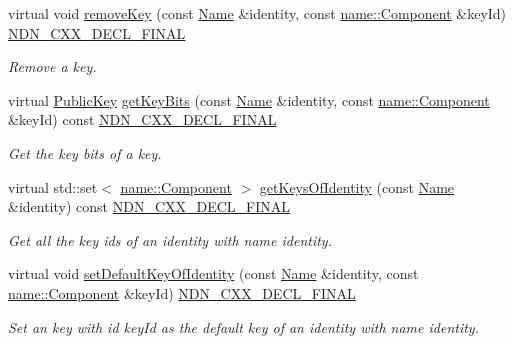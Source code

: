 \begin{DoxyCompactItemize}
virtual void \hyperlink{classndn_1_1security_1_1PibSqlite3_a72fcfeecf043d0a932262c148d04d63b}{remove\+Key} (const \hyperlink{classndn_1_1Name}{Name} \&identity, const \hyperlink{classndn_1_1name_1_1Component}{name\+::\+Component} \&key\+Id) \hyperlink{ndn-cxx_2src_2common_8hpp_ab53a383abb72682805543301b5f2c244}{N\+D\+N\+\_\+\+C\+X\+X\+\_\+\+D\+E\+C\+L\+\_\+\+F\+I\+N\+AL}
\begin{DoxyCompactList}\small\item\em Remove a key. \end{DoxyCompactList}\item 
virtual \hyperlink{classndn_1_1PublicKey}{Public\+Key} \hyperlink{classndn_1_1security_1_1PibSqlite3_ab6608956b24969bc84231c8f5f4cebbc}{get\+Key\+Bits} (const \hyperlink{classndn_1_1Name}{Name} \&identity, const \hyperlink{classndn_1_1name_1_1Component}{name\+::\+Component} \&key\+Id) const \hyperlink{ndn-cxx_2src_2common_8hpp_ab53a383abb72682805543301b5f2c244}{N\+D\+N\+\_\+\+C\+X\+X\+\_\+\+D\+E\+C\+L\+\_\+\+F\+I\+N\+AL}
\begin{DoxyCompactList}\small\item\em Get the key bits of a key. \end{DoxyCompactList}\item 
virtual std\+::set$<$ \hyperlink{classndn_1_1name_1_1Component}{name\+::\+Component} $>$ \hyperlink{classndn_1_1security_1_1PibSqlite3_adf5f01a4770737f862b3e60d1ccd7b16}{get\+Keys\+Of\+Identity} (const \hyperlink{classndn_1_1Name}{Name} \&identity) const \hyperlink{ndn-cxx_2src_2common_8hpp_ab53a383abb72682805543301b5f2c244}{N\+D\+N\+\_\+\+C\+X\+X\+\_\+\+D\+E\+C\+L\+\_\+\+F\+I\+N\+AL}
\begin{DoxyCompactList}\small\item\em Get all the key ids of an identity with name {\ttfamily identity}. \end{DoxyCompactList}\item 
virtual void \hyperlink{classndn_1_1security_1_1PibSqlite3_afc5dd4299663177bb79d85e80debf567}{set\+Default\+Key\+Of\+Identity} (const \hyperlink{classndn_1_1Name}{Name} \&identity, const \hyperlink{classndn_1_1name_1_1Component}{name\+::\+Component} \&key\+Id) \hyperlink{ndn-cxx_2src_2common_8hpp_ab53a383abb72682805543301b5f2c244}{N\+D\+N\+\_\+\+C\+X\+X\+\_\+\+D\+E\+C\+L\+\_\+\+F\+I\+N\+AL}
\begin{DoxyCompactList}\small\item\em Set an key with id {\ttfamily key\+Id} as the default key of an identity with name {\ttfamily identity}. \end{DoxyCompactList}\item 

\end{DoxyCompactItemize}
